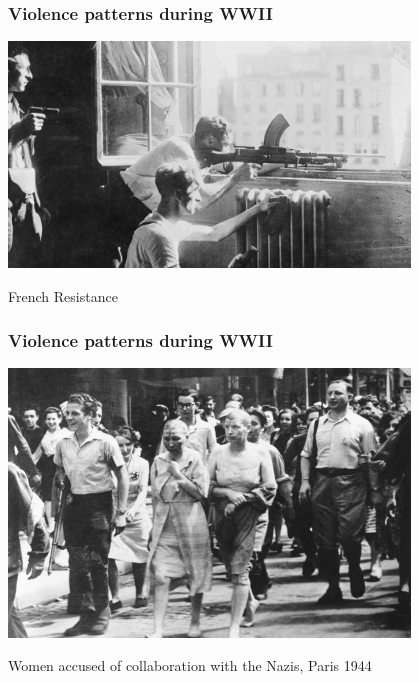 \documentclass[aspectratio=43]{beamer}
\begin{document}
\begin{frame}
\frametitle{Violence patterns during WWII}
\centering

\includegraphics[width = 0.8\textwidth]{img/wwii-resistance}

French Resistance

\end{frame}

\begin{frame}
\frametitle{Violence patterns during WWII}
\centering

\includegraphics[width = 0.8\textwidth]{img/wwii-womencolab}

Women accused of collaboration with the Nazis, Paris 1944

\end{frame}
\end{document}

